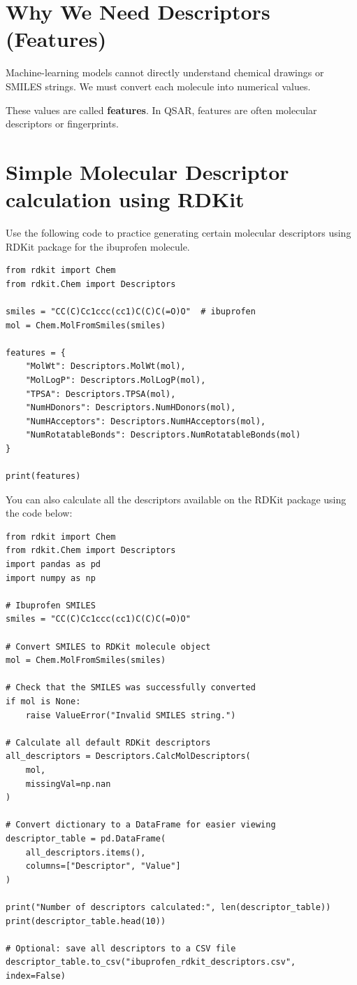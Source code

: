 \documentclass[11pt]{report}
\newenvironment{Important note}{\begin{quote}\color{red}\textbf{Important note:} }{\end{quote}}
\begin{document}
\section{Why We Need Descriptors (Features)}

Machine-learning models cannot directly understand chemical drawings or SMILES strings. We must convert each molecule into numerical values.

These values are called \textbf{features}. In QSAR, features are often molecular descriptors or fingerprints.

\section{Simple Molecular Descriptor calculation using RDKit}
Use the following code to practice generating certain molecular descriptors using RDKit package for the ibuprofen molecule.   
\begin{lstlisting}[style=pythonstyle, caption={Calculating simple RDKit descriptors.}]
from rdkit import Chem
from rdkit.Chem import Descriptors

smiles = "CC(C)Cc1ccc(cc1)C(C)C(=O)O"  # ibuprofen
mol = Chem.MolFromSmiles(smiles)

features = {
    "MolWt": Descriptors.MolWt(mol),
    "MolLogP": Descriptors.MolLogP(mol),
    "TPSA": Descriptors.TPSA(mol),
    "NumHDonors": Descriptors.NumHDonors(mol),
    "NumHAcceptors": Descriptors.NumHAcceptors(mol),
    "NumRotatableBonds": Descriptors.NumRotatableBonds(mol)
}

print(features)
\end{lstlisting}

You can also calculate all the descriptors available on the RDKit package using the code below:

\begin{lstlisting}[style=pythonstyle, caption={Calculating all default RDKit descriptors for ibuprofen.}]
from rdkit import Chem
from rdkit.Chem import Descriptors
import pandas as pd
import numpy as np

# Ibuprofen SMILES
smiles = "CC(C)Cc1ccc(cc1)C(C)C(=O)O"

# Convert SMILES to RDKit molecule object
mol = Chem.MolFromSmiles(smiles)

# Check that the SMILES was successfully converted
if mol is None:
    raise ValueError("Invalid SMILES string.")

# Calculate all default RDKit descriptors
all_descriptors = Descriptors.CalcMolDescriptors(
    mol,
    missingVal=np.nan
)

# Convert dictionary to a DataFrame for easier viewing
descriptor_table = pd.DataFrame(
    all_descriptors.items(),
    columns=["Descriptor", "Value"]
)

print("Number of descriptors calculated:", len(descriptor_table))
print(descriptor_table.head(10))

# Optional: save all descriptors to a CSV file
descriptor_table.to_csv("ibuprofen_rdkit_descriptors.csv", index=False)
\end{lstlisting}
\end{document}
